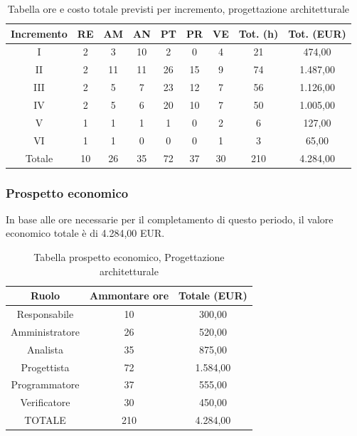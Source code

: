 \begin{table}[h]
	\caption{Tabella ore e costo totale previsti per incremento, progettazione architetturale}
	\begin{center}
		\begin{tabular}{ |c|c|c|c|c|c|c|c|c|  }
			\hline
			Incremento 		& RE 	& AM 	& AN 	& PT 	& PR 	& VE 	& Tot. (h) & Tot. (EUR) \\
			\hline\hline
			I		& 2 		& 3			& 10 	& 2 	& 0 		& 4 		& 21	 & 474,00\\
			II		& 2 		& 11 		& 11 	& 26	& 15 		& 9 		& 74	&1.487,00\\
			III		& 2 		& 5 		& 7 	& 23	& 12 		& 7 		& 56	&1.126,00\\
			IV		& 2 		& 5 		& 6 	& 20 	& 10 		& 7 		& 50 	&1.005,00\\
			V		& 1 		& 1 		& 1 	& 1		& 0 		& 2	 		& 6			&127,00\\
			VI		& 1 		& 1 		& 0 	& 0 	& 0 		& 1 		& 3			&65,00\\
			\hline\hline
			Totale		& 10		& 26		& 35 	& 72	 	& 37 	& 30 	& 210 	&4.284,00\\
			\hline
		\end{tabular}
	\end{center}
\end{table}

\subsubsection{Prospetto economico}
In base alle ore necessarie per il completamento di questo periodo, il valore economico totale è di 4.284,00 EUR.
\begin{table}[h!]
	\caption{Tabella prospetto economico, Progettazione architetturale}
\begin{center}
\begin{tabular}{ |c|c|c|  }
 \hline
 Ruolo 		& Ammontare ore 	& Totale (EUR)\\
 	\hline
 \hline
 	Responsabile	& 10 	& 300,00\\
	Amministratore	& 26		& 520,00\\
	Analista		& 35 	& 875,00\\
	Progettista		& 72		& 1.584,00\\
	Programmatore	& 37		& 555,00\\
	Verificatore	& 30 	& 450,00\\
 \hline\hline
 TOTALE		& 210		& 4.284,00\\
  \hline
\end{tabular}
\end{center}
\end{table}
\newpage

